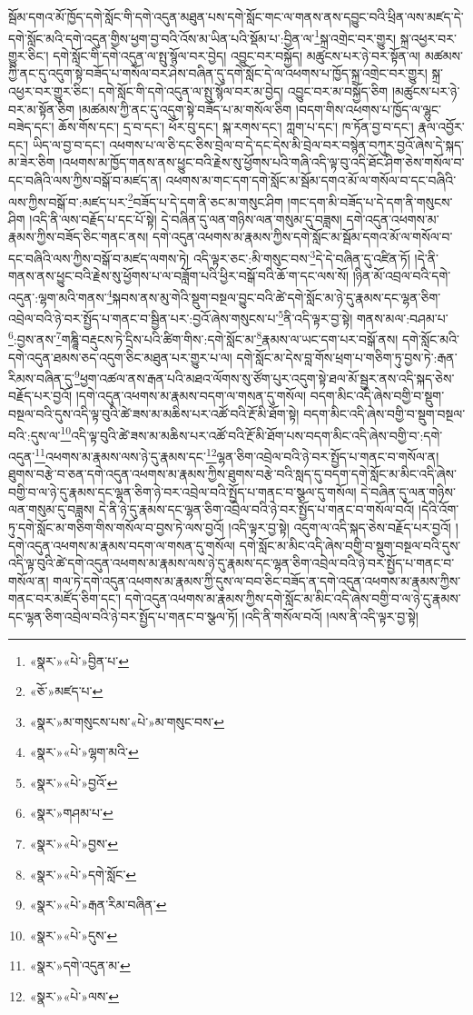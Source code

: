 སྦོམ་དགའ་མོ་ཁྱོད་དགེ་སློང་གི་དགེ་འདུན་མཐུན་པས་དགེ་སློང་གང་ལ་གནས་ནས་དབྱུང་བའི་ཕྲིན་ལས་མཛད་དེ་དགེ་སློང་མའི་དགེ་འདུན་གྱིས་ཕྱག་བྱ་བའི་འོས་མ་ཡིན་པའི་སྡོམ་པ་:བྱིན་ལ་\footnote{«སྣར་»«པེ་»བྱིན་པ་}སྐྲ་འགྲེང་བར་གྱུར། སྐྲ་འཕྱར་བར་གྱུར་ཅིང་། དགེ་སློང་གི་དགེ་འདུན་ལ་སྤུ་སྙོལ་བར་བྱེད། འབྱུང་བར་བསྐྱོད། མཚུངས་པར་ཉེ་བར་སྟོན་ལ། མཚམས་ཀྱི་ནང་དུ་འདུག་སྟེ་བཟོད་པ་གསོལ་བར་ཤེས་བཞིན་དུ་དགེ་སློང་དེ་ལ་འཕགས་པ་ཁྱོད་སྐྲ་འགྲེང་བར་གྱུར། སྐྲ་འཕྱར་བར་གྱུར་ཅིང་། དགེ་སློང་གི་དགེ་འདུན་ལ་སྤུ་སྙོལ་བར་མ་བྱེད། འབྱུང་བར་མ་བསྐྱོད་ཅིག །མཚུངས་པར་ཉེ་བར་མ་སྟོན་ཅིག །མཚམས་ཀྱི་ནང་དུ་འདུག་སྟེ་བཟོད་པ་མ་གསོལ་ཅིག །བདག་གིས་འཕགས་པ་ཁྱོད་ལ་ལྷུང་བཟེད་དང་། ཆོས་གོས་དང་། དྲ་བ་དང་། ཕོར་བུ་དང་། སྐ་རགས་དང་། ཀླག་པ་དང་། ཁ་ཏོན་བྱ་བ་དང་། རྣལ་འབྱོར་དང་། ཡིད་ལ་བྱ་བ་དང་། འཕགས་པ་ལ་ཅི་དང་ཅིས་བྲེལ་བ་དེ་དང་དེས་མི་བྲེལ་བར་བསྙེན་བཀུར་བྱའོ་ཞེས་དེ་སྐད་མ་ཟེར་ཅིག །འཕགས་མ་ཁྱོད་གནས་ནས་ཕྱུང་བའི་རྗེས་སུ་ཕྱོགས་པའི་གཞི་འདི་ལྟ་བུ་འདི་ཐོང་ཤིག་ཅེས་གསོལ་བ་དང་བཞིའི་ལས་ཀྱིས་བསྒོ་བ་མཛད་ན། འཕགས་མ་གང་དག་དགེ་སློང་མ་སྦོམ་དགའ་མོ་ལ་གསོལ་བ་དང་བཞིའི་ལས་ཀྱིས་བསྒོ་བ་:མཛད་པར་\footnote{«ཅོ་»མཛད་པ་}བཟོད་པ་དེ་དག་ནི་ཅང་མ་གསུང་ཤིག །གང་དག་མི་བཟོད་པ་དེ་དག་ནི་གསུངས་ཤིག །འདི་ནི་ལས་བརྗོད་པ་དང་པོ་སྟེ། དེ་བཞིན་དུ་ལན་གཉིས་ལན་གསུམ་དུ་བཟླས། དགེ་འདུན་འཕགས་མ་རྣམས་ཀྱིས་བཟོད་ཅིང་གནང་ནས། དགེ་འདུན་འཕགས་མ་རྣམས་ཀྱིས་དགེ་སློང་མ་སྦོམ་དགའ་མོ་ལ་གསོལ་བ་དང་བཞིའི་ལས་ཀྱིས་བསྒོ་བ་མཛད་ལགས་ཏེ། འདི་ལྟར་ཅང་:མི་གསུང་བས་\footnote{«སྣར་»མ་གསུངས་པས་«པེ་»མ་གསུང་བས་}དེ་དེ་བཞིན་དུ་འཛིན་ཏོ། །དེ་ནི་གནས་ནས་ཕྱུང་བའི་རྗེས་སུ་ཕྱོགས་པ་ལ་བཟློག་པའི་ཕྱིར་བསྒོ་བའི་ཆོ་ག་དང་ལས་སོ། །ཉིན་མོ་འབྲལ་བའི་དགེ་འདུན་:ལྷག་མའི་གནས་\footnote{«སྣར་»«པེ་»ལྷག་མའི་}སྐབས་ནས་མུ་གེའི་སྡུག་བསྔལ་བྱུང་བའི་ཚེ་དགེ་སློང་མ་ཉེ་དུ་རྣམས་དང་ལྷན་ཅིག་འབྲེལ་བའི་ཉེ་བར་སྤྱོད་པ་གནང་བ་སྦྱིན་པར་:བྱའོ་ཞེས་གསུངས་པ་\footnote{«སྣར་»«པེ་»བྱའོ་}ནི་འདི་ལྟར་བྱ་སྟེ། གནས་མལ་:བཤམ་པ་\footnote{«སྣར་»གཤམ་པ་}:བྱས་ནས་\footnote{«སྣར་»«པེ་»བྱས་}གཎྜཱི་བརྡུངས་ཏེ་དྲིས་པའི་ཚིག་གིས་:དགེ་སློང་མ་\footnote{«སྣར་»«པེ་»དགེ་སློང་}རྣམས་ལ་ཡང་དག་པར་བསྒོ་ནས། དགེ་སློང་མའི་དགེ་འདུན་ཐམས་ཅད་འདུག་ཅིང་མཐུན་པར་གྱུར་པ་ལ། དགེ་སློང་མ་དེས་བླ་གོས་ཕྲག་པ་གཅིག་ཏུ་བྱས་ཏེ་:རྒན་རིམས་བཞིན་དུ་\footnote{«སྣར་»«པེ་»རྒན་རིམ་བཞིན་}ཕྱག་འཚལ་ནས་རྒན་པའི་མཐའ་ལོགས་སུ་ཙོག་པུར་འདུག་སྟེ་ཐལ་མོ་སྦྱར་ནས་འདི་སྐད་ཅེས་བརྗོད་པར་བྱའོ། །དགེ་འདུན་འཕགས་མ་རྣམས་བདག་ལ་གསན་དུ་གསོལ། བདག་མིང་འདི་ཞེས་བགྱི་བ་སྡུག་བསྔལ་བའི་དུས་འདི་ལྟ་བུའི་ཚེ་ཟས་མ་མཆིས་པར་འཚོ་བའི་རྔོ་མི་ཐོག་སྟེ། བདག་མིང་འདི་ཞེས་བགྱི་བ་སྡུག་བསྔལ་བའི་:དུས་ལ་\footnote{«སྣར་»«པེ་»དུས་}འདི་ལྟ་བུའི་ཚེ་ཟས་མ་མཆིས་པར་འཚོ་བའི་རྔོ་མི་ཐོག་པས་བདག་མིང་འདི་ཞེས་བགྱི་བ་:དགེ་འདུན་\footnote{«སྣར་»དགེ་འདུན་མ་}འཕགས་མ་རྣམས་ལས་ཉེ་དུ་རྣམས་དང་\footnote{«སྣར་»«པེ་»ལས་}ལྷན་ཅིག་འབྲེལ་བའི་ཉེ་བར་སྤྱོད་པ་གནང་བ་གསོལ་ན། ཐུགས་བརྩེ་བ་ཅན་དགེ་འདུན་འཕགས་མ་རྣམས་ཀྱིས་ཐུགས་བརྩེ་བའི་སླད་དུ་བདག་དགེ་སློང་མ་མིང་འདི་ཞེས་བགྱི་བ་ལ་ཉེ་དུ་རྣམས་དང་ལྷན་ཅིག་ཉེ་བར་འབྲེལ་བའི་སྤྱོད་པ་གནང་བ་སྩལ་དུ་གསོལ། དེ་བཞིན་དུ་ལན་གཉིས་ལན་གསུམ་དུ་བཟླས། དེ་ནི་ཉེ་དུ་རྣམས་དང་ལྷན་ཅིག་འབྲེལ་བའི་ཉེ་བར་སྤྱོད་པ་གནང་བ་གསོལ་བའོ། །དེའི་འོག་ཏུ་དགེ་སློང་མ་གཅིག་གིས་གསོལ་བ་བྱས་ཏེ་ལས་བྱའོ། །འདི་ལྟར་བྱ་སྟེ། འདུག་ལ་འདི་སྐད་ཅེས་བརྗོད་པར་བྱའོ། །དགེ་འདུན་འཕགས་མ་རྣམས་བདག་ལ་གསན་དུ་གསོལ། དགེ་སློང་མ་མིང་འདི་ཞེས་བགྱི་བ་སྡུག་བསྔལ་བའི་དུས་འདི་ལྟ་བུའི་ཚེ་དགེ་འདུན་འཕགས་མ་རྣམས་ལས་ཉེ་དུ་རྣམས་དང་ལྷན་ཅིག་འབྲེལ་བའི་ཉེ་བར་སྤྱོད་པ་གནང་བ་གསོལ་ན། གལ་ཏེ་དགེ་འདུན་འཕགས་མ་རྣམས་ཀྱི་དུས་ལ་བབ་ཅིང་བཟོད་ན་དགེ་འདུན་འཕགས་མ་རྣམས་ཀྱིས་གནང་བར་མཛོད་ཅིག་དང་། དགེ་འདུན་འཕགས་མ་རྣམས་ཀྱིས་དགེ་སློང་མ་མིང་འདི་ཞེས་བགྱི་བ་ལ་ཉེ་དུ་རྣམས་དང་ལྷན་ཅིག་འབྲེལ་བའི་ཉེ་བར་སྤྱོད་པ་གནང་བ་སྩལ་ཏོ། །འདི་ནི་གསོལ་བའོ། །ལས་ནི་འདི་ལྟར་བྱ་སྟེ། 